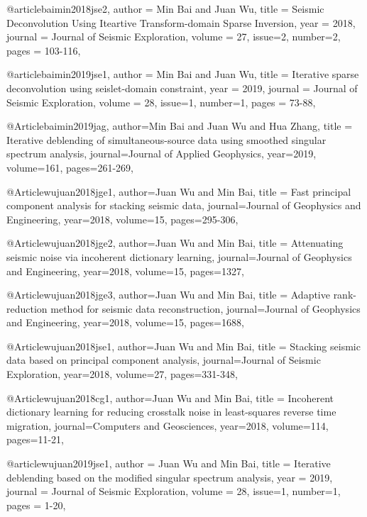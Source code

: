 @article{baimin2018jse2,
  author =	 {Min Bai and Juan Wu},
  title =	 {Seismic Deconvolution Using Iteartive Transform-domain Sparse Inversion},
  year =	 2018,
  journal =	 {Journal of Seismic Exploration},
  volume =	 27,
  issue=2,
  number=2,
  pages =	 {103-116},
}

@article{baimin2019jse1,
  author =	 {Min Bai and Juan Wu},
  title =	 {Iterative sparse deconvolution using seislet-domain constraint},
  year =	 2019,
  journal =	 {Journal of Seismic Exploration},
  volume =	 28,
  issue=1,
  number=1,
  pages =	 {73-88},
}

@Article{baimin2019jag,
  author={Min Bai and Juan Wu and Hua Zhang},
  title = {Iterative deblending of simultaneous-source data using smoothed singular spectrum analysis},
  journal={Journal of Applied Geophysics},
  year=2019,
  volume=161,
  pages={261-269},
}


@Article{wujuan2018jge1,
  author={Juan Wu and Min Bai},
  title = {Fast principal component analysis for stacking seismic data},
  journal={Journal of Geophysics and Engineering},
  year=2018,
  volume=15,
  pages={295-306},
}

@Article{wujuan2018jge2,
  author={Juan Wu and Min Bai},
  title = {Attenuating seismic noise via incoherent dictionary learning},
  journal={Journal of Geophysics and Engineering},
  year=2018,
  volume=15,
  pages={1327},
}

@Article{wujuan2018jge3,
  author={Juan Wu and Min Bai},
  title = {Adaptive rank-reduction method for seismic data reconstruction},
  journal={Journal of Geophysics and Engineering},
  year=2018,
  volume=15,
  pages={1688},
}

@Article{wujuan2018jse1,
  author={Juan Wu and Min Bai},
  title = {Stacking seismic data based on principal component analysis},
  journal={Journal of Seismic Exploration},
  year=2018,
  volume=27,
  pages={331-348},
}

@Article{wujuan2018cg1,
  author={Juan Wu and Min Bai},
  title = {Incoherent dictionary learning for reducing crosstalk noise in least-squares reverse time migration},
  journal={Computers and Geosciences},
  year=2018,
  volume=114,
  pages={11-21},
}

@article{wujuan2019jse1,
  author =	 {Juan Wu and Min Bai},
  title =	 {Iterative deblending based on the modified singular spectrum analysis},
  year =	 2019,
  journal =	 {Journal of Seismic Exploration},
  volume =	 28,
  issue=1,
  number=1,
  pages =	 {1-20},
}



